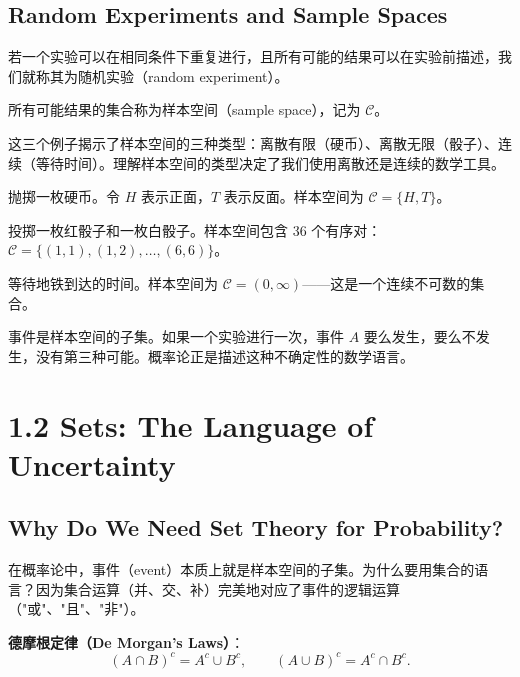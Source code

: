 \subsection{Random Experiments and Sample Spaces}

若一个实验可以在相同条件下重复进行，且所有可能的结果可以在实验前描述，我们就称其为随机实验（random experiment）。

所有可能结果的集合称为样本空间（sample space），记为 $\mathcal{C}$。

这三个例子揭示了样本空间的三种类型：离散有限（硬币）、离散无限（骰子）、连续（等待时间）。理解样本空间的类型决定了我们使用离散还是连续的数学工具。

\begin{example}\label{ex:coin-toss-ch1}
抛掷一枚硬币。令 $H$ 表示正面，$T$ 表示反面。样本空间为 $\mathcal{C} = \{H, T\}$。
\end{example}

\begin{example}\label{ex:two-dice-ch1}
投掷一枚红骰子和一枚白骰子。样本空间包含 36 个有序对：$\mathcal{C} = \{(1,1), (1,2), \ldots, (6,6)\}$。
\end{example}

\begin{example}\label{ex:waiting-time-ch1}
等待地铁到达的时间。样本空间为 $\mathcal{C} = (0, \infty)$——这是一个连续不可数的集合。
\end{example}

事件是样本空间的子集。如果一个实验进行一次，事件 $A$ 要么发生，要么不发生，没有第三种可能。概率论正是描述这种不确定性的数学语言。

\section{1.2 Sets: The Language of Uncertainty}\label{sec:1.2}

\subsection{Why Do We Need Set Theory for Probability?}

在概率论中，事件（event）本质上就是样本空间的子集。为什么要用集合的语言？因为集合运算（并、交、补）完美地对应了事件的逻辑运算（"或"、"且"、"非"）。

\textbf{德摩根定律（De Morgan's Laws）}：
\[
(A \cap B)^c = A^c \cup B^c, \qquad (A \cup B)^c = A^c \cap B^c.
\label{eq:de-morgan}
\]

